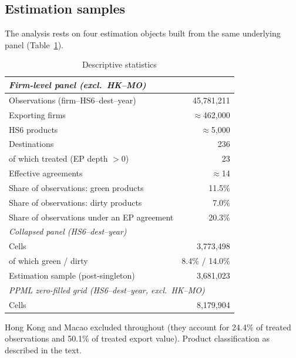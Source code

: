 \documentclass[12pt]{article}
\begin{document}
\subsection{Estimation samples}

The analysis rests on four estimation objects built from the same underlying panel
(Table~\ref{tab:descriptives}).

\begin{table}[htbp]
\centering
\caption{Descriptive statistics}
\label{tab:descriptives}
\small
\begin{threeparttable}
\begin{tabular}{lr}
\toprule
\multicolumn{2}{l}{\textit{Firm-level panel (excl.\ HK--MO)}} \\
\midrule
Observations (firm--HS6--dest--year) & 45{,}781{,}211 \\
Exporting firms & $\approx$462{,}000 \\
HS6 products & $\approx$5{,}000 \\
Destinations & 236 \\
\quad of which treated (EP depth $>0$) & 23 \\
Effective agreements & $\approx$14 \\
Share of observations: green products & 11.5\% \\
Share of observations: dirty products & 7.0\% \\
Share of observations under an EP agreement & 20.3\% \\
\midrule
\multicolumn{2}{l}{\textit{Collapsed panel (HS6--dest--year)}} \\
\midrule
Cells & 3{,}773{,}498 \\
\quad of which green / dirty & 8.4\% / 14.0\% \\
Estimation sample (post-singleton) & 3{,}681{,}023 \\
\midrule
\multicolumn{2}{l}{\textit{PPML zero-filled grid (HS6--dest--year, excl.\ HK--MO)}} \\
\midrule
Cells & 8{,}179{,}904 \\
\bottomrule
\end{tabular}
\begin{tablenotes}\footnotesize
\item Hong Kong and Macao excluded throughout (they account for 24.4\% of treated
observations and 50.1\% of treated export value). Product classification as described
in the text.
\end{tablenotes}
\end{threeparttable}
\end{table}
\end{document}
